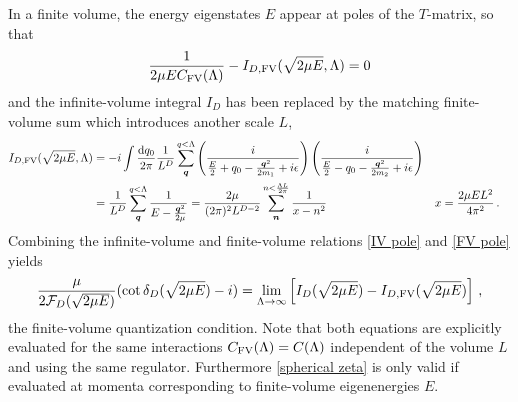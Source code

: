 In a finite volume, the energy eigenstates $E$ appear at poles of the $T$-matrix, so that
\begin{equation}\label{eq:FV pole}
    \frac{1}{2\mu E C_{\textrm{FV}}(\Lambda) } - I_{D, \textrm{FV}}(\sqrt{2\mu E}, \Lambda) = 0
\end{equation}
and the infinite-volume integral $I_D$ has been replaced by the matching finite-volume sum which introduces another scale $L$,
\begin{align}
I_{D,\textrm{FV}}(\sqrt{2\mu E}, \Lambda)
    &=-i\int \frac { \mathrm {d}q_0}{2\pi} \frac{1}{L^D}\sum_{\boldsymbol{q}}^{q < \Lambda} \left( \frac { i } { \frac{E}{2} + q _ { 0 } - \frac{\boldsymbol{q}^2}{2m_1} + i \epsilon } \right) \left( \frac { i } { \frac{E}{2} - q _ { 0 } - \frac{\boldsymbol{q}^2}{2m_2} + i \epsilon } \right)
    \\
    \label{eq:I0 FV}
    &=\frac{1}{L^D}\sum_{\boldsymbol{q}}^{q < \Lambda} \frac { 1 } { E - \frac{\boldsymbol{q}^2}{2\mu} }
    =\frac{2\mu}{(2\pi)^2 L^{D-2}} \sum_{\boldsymbol{n}}^{n < \frac{\Lambda L}{2\pi}} \frac{1}{x-n^2}
    &
    x &= \frac{2\mu E L^2}{4\pi^2}
    \, .
\end{align}
Combining the infinite-volume and finite-volume relations \eqref{IV pole} and \eqref{FV pole} yields
\begin{equation}\label{eq:spherical zeta}
    \frac{\mu}{2\mathcal{F}_{D}(\sqrt{2\mu E})}(\cot\delta_{D}(\sqrt{2\mu E})-i)
    =
    \lim\limits_{\Lambda \to \infty} \left[ I_D(\sqrt{2\mu E}) - I_{D,\textrm{FV}}(\sqrt{2\mu E}) \right] \, ,
\end{equation}
the finite-volume quantization condition.
Note that both equations are explicitly evaluated for the same interactions $C_{\textrm{FV}}(\Lambda) = C(\Lambda)$ independent of the volume $L$ and using the same regulator.
Furthermore \eqref{spherical zeta} is only valid if evaluated at momenta corresponding to finite-volume eigenenergies $E$.


